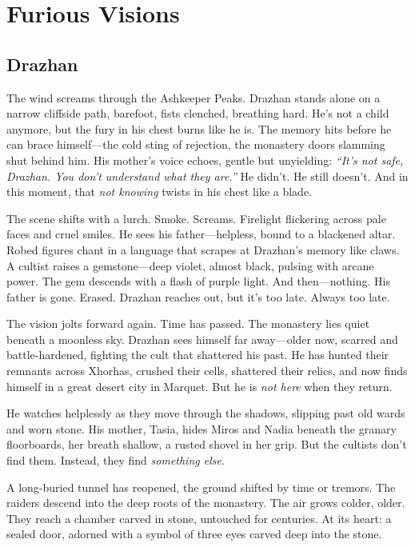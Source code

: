 \documentclass[10pt,a4paper,bg=print,twocolumn,openany,nodeprecatedcode]{dndarticle}
\begin{document}
\section*{Furious Visions}

\subsection*{Drazhan}

The wind screams through the Ashkeeper Peaks. Drazhan stands alone on a narrow cliffside path, barefoot, fists clenched, breathing hard. He’s not a child anymore, but the fury in his chest burns like he is. The memory hits before he can brace himself—the cold sting of rejection, the monastery doors slamming shut behind him. His mother’s voice echoes, gentle but unyielding: \textit{“It’s not safe, Drazhan. You don’t understand what they are.”} He didn’t. He still doesn’t. And in this moment, that \textit{not knowing} twists in his chest like a blade.

The scene shifts with a lurch. Smoke. Screams. Firelight flickering across pale faces and cruel smiles. He sees his father—helpless, bound to a blackened altar. Robed figures chant in a language that scrapes at Drazhan’s memory like claws. A cultist raises a gemstone—deep violet, almost black, pulsing with arcane power. The gem descends with a flash of purple light. And then—nothing. His father is gone. Erased. Drazhan reaches out, but it’s too late. Always too late.

The vision jolts forward again. Time has passed. The monastery lies quiet beneath a moonless sky. Drazhan sees himself far away—older now, scarred and battle-hardened, fighting the cult that shattered his past. He has hunted their remnants across Xhorhas, crushed their cells, shattered their relics, and now finds himself in a great desert city in Marquet. But he is \textit{not here} when they return.

He watches helplessly as they move through the shadows, slipping past old wards and worn stone. His mother, Tasia, hides Miros and Nadia beneath the granary floorboards, her breath shallow, a rusted shovel in her grip. But the cultists don’t find them. Instead, they find \textit{something else}.

A long-buried tunnel has reopened, the ground shifted by time or tremors. The raiders descend into the deep roots of the monastery. The air grows colder, older. They reach a chamber carved in stone, untouched for centuries. At its heart: a sealed door, adorned with a symbol of three eyes carved deep into the stone.
\end{document}
